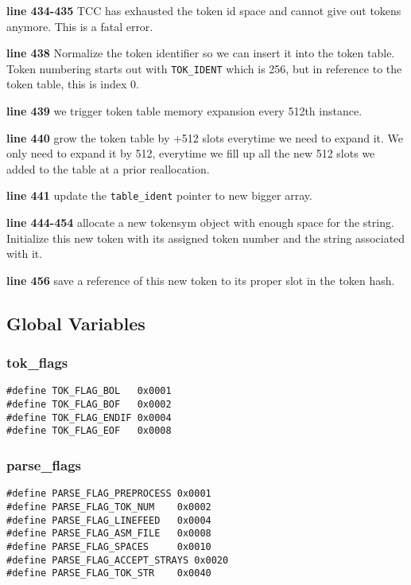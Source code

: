 \begin{tcc_desc}
\textbf{line 434-435} TCC has exhausted the token id space and cannot give out tokens anymore. This is a fatal error.

\textbf{line 438} Normalize the token identifier so we can insert it into the token table. Token numbering starts out with \verb|TOK_IDENT| which is 256, but in reference to the token table, this is index 0.

\textbf{line 439} we trigger token table memory expansion every 512th instance.

\textbf{line 440} grow the token table by +512 slots everytime we need to expand it. We only need to expand it by 512, everytime we fill up all the new 512 slots we added to the table at a prior reallocation.

\textbf{line 441} update the \verb|table_ident| pointer to new bigger array.

\textbf{line 444-454} allocate a new tokensym object with enough space for the string. Initialize this new token with its assigned token number and the string associated with it.

\textbf{line 456} save a reference of this new token to its proper slot in the token hash.
\end{tcc_desc}

\subsection{Global Variables}

\subsubsection{tok\_flags}

\begin{verbatim}
#define TOK_FLAG_BOL   0x0001
#define TOK_FLAG_BOF   0x0002
#define TOK_FLAG_ENDIF 0x0004
#define TOK_FLAG_EOF   0x0008
\end{verbatim}


\subsubsection{parse\_flags}

\begin{verbatim}
#define PARSE_FLAG_PREPROCESS 0x0001
#define PARSE_FLAG_TOK_NUM    0x0002
#define PARSE_FLAG_LINEFEED   0x0004
#define PARSE_FLAG_ASM_FILE   0x0008
#define PARSE_FLAG_SPACES     0x0010
#define PARSE_FLAG_ACCEPT_STRAYS 0x0020
#define PARSE_FLAG_TOK_STR    0x0040
\end{verbatim}

